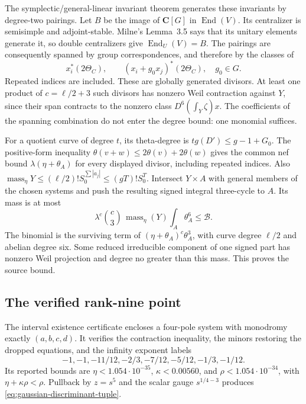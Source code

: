 \documentclass[11pt]{article}
\theoremstyle{definition}
\theoremstyle{remark}
\begin{document}
The symplectic/general-linear invariant theorem generates these
invariants by degree-two pairings.
Let $B$ be the image of $\mathbf C[G]$ in $\operatorname{End}(V)$.
Its centralizer is semisimple and adjoint-stable.
Milne's Lemma~3.5 \cite{MilneLefschetz} says that its unitary elements generate it, so
double centralizers give $\operatorname{End}_U(V)=B$.
The pairings are consequently spanned by group correspondences,
and therefore by the classes of
\[
 x_i^*(2\Theta_C),\qquad (x_i+g_0x_j)^*(2\Theta_C),\quad g_0\in G.
\]
Repeated indices are included.  These are globally generated divisors.
At least one product of $c=\ell/2+3$ such divisors has nonzero Weil
contraction against $Y$, since their span contracts to the nonzero
class $D^6(\int_Y\zeta)x$.
The coefficients of the spanning combination do not enter the degree
bound: one monomial suffices.

For a quotient curve of degree $t$, its theta-degree is
$tg(D')\le g-1+G_0$.
The positive-form inequality
$\theta(v+w)\le2\theta(v)+2\theta(w)$ gives the common nef bound
$\lambda(\eta+\theta_A)$ for every displayed divisor, including
repeated indices.
Also
$\operatorname{mass}_\eta Y\le(\ell/2)!S_0^{\sum|a_j|}
\le(gT)!S_0^T$.
Intersect $Y\times A$ with general members of the chosen systems and
push the resulting signed integral three-cycle to $A$.
Its mass is at most
\[
 \lambda^c\binom c3\,\operatorname{mass}_\eta(Y)
                   \int_A\theta_A^6\le\mathcal B.
\]
The binomial is the surviving term of
$(\eta+\theta_A)^c\theta_A^3$, with curve degree $\ell/2$ and
abelian degree six.
Some reduced irreducible component of one signed part has nonzero
Weil projection and degree no greater than this mass.
This proves the source bound.

\subsection{The verified rank-nine point}

The interval existence certificate encloses a four-pole system
with monodromy exactly $(a,b,c,d)$.
It verifies the contraction inequality, the minors restoring the
dropped equations, and the infinity exponent labels
\[
 -1,-1,-11/12,-2/3,-7/12,-5/12,-1/3,-1/12.
\]
Its reported bounds are $\eta<1.054\cdot10^{-35}$,
$\kappa<0.00560$, and $\rho<1.054\cdot10^{-34}$, with
$\eta+\kappa\rho<\rho$.
Pullback by $z=s^5$ and the scalar gauge $s^{1/4-3}$ produces
\eqref{eq:gaussian-discriminant-tuple}.
\end{document}

